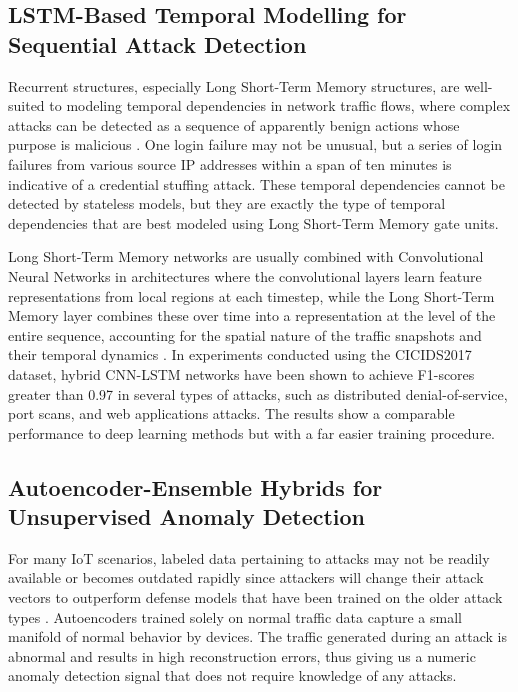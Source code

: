 \documentclass[12pt]{article}
\begin{document}
\subsection{LSTM-Based Temporal Modelling for Sequential Attack Detection}

Recurrent structures, especially Long Short-Term Memory structures, are well-suited to modeling temporal dependencies in network traffic flows, where complex attacks can be detected as a sequence of apparently benign actions whose purpose is malicious \cite{yin2017deep}. One login failure may not be unusual, but a series of login failures from various source IP addresses within a span of ten minutes is indicative of a credential stuffing attack. These temporal dependencies cannot be detected by stateless models, but they are exactly the type of temporal dependencies that are best modeled using Long Short-Term Memory gate units.

Long Short-Term Memory networks are usually combined with Convolutional Neural Networks in architectures where the convolutional layers learn feature representations from local regions at each timestep, while the Long Short-Term Memory layer combines these over time into a representation at the level of the entire sequence, accounting for the spatial nature of the traffic snapshots and their temporal dynamics \cite{almiani2020deep}. In experiments conducted using the CICIDS2017 dataset, hybrid CNN-LSTM networks have been shown to achieve F1-scores greater than 0.97 in several types of attacks, such as distributed denial-of-service, port scans, and web applications attacks. The results show a comparable performance to deep learning methods but with a far easier training procedure.

\subsection{Autoencoder-Ensemble Hybrids for Unsupervised Anomaly Detection}

For many IoT scenarios, labeled data pertaining to attacks may not be readily available or becomes outdated rapidly since attackers will change their attack vectors to outperform defense models that have been trained on the older attack types \cite{meidan2018n}. Autoencoders trained solely on normal traffic data capture a small manifold of normal behavior by devices. The traffic generated during an attack is abnormal and results in high reconstruction errors, thus giving us a numeric anomaly detection signal that does not require knowledge of any attacks.
\end{document}
